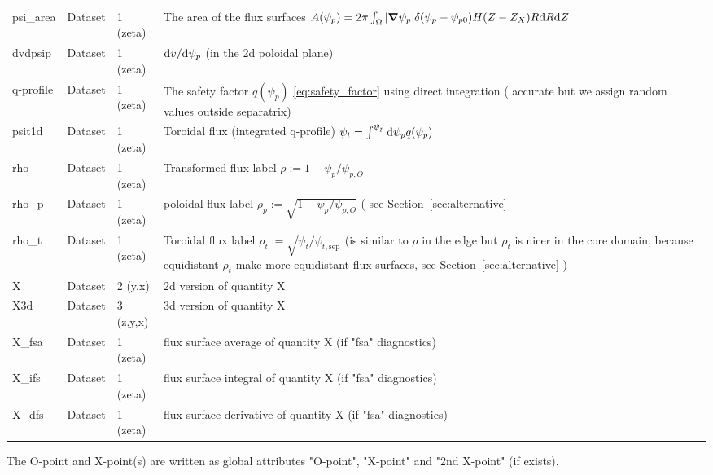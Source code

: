 \begin{longtable}{lll>{\RaggedRight}p{7cm}}
psi\_area        & Dataset & 1 (zeta) & The area of the flux surfaces $A(\psi_p) = 2\pi \int_\Omega |{\boldsymbol{\nabla}}\psi_p| \delta(\psi_p - \psi_{p0}) H(Z-Z_X) R\mathrm{d} R\mathrm{d} Z$ \\
dvdpsip          & Dataset & 1 (zeta) & $\mathrm{d} v/\mathrm{d}\psi_p$ (in the 2d poloidal plane) \\
q-profile        & Dataset & 1 (zeta) & The safety factor $q(\psi_p)$ \eqref{eq:safety_factor} using direct integration ( accurate but we assign random values outside separatrix) \\
psit1d           & Dataset & 1 (zeta) & Toroidal flux (integrated q-profile) $\psi_t = \int^{\psi_p} \mathrm{d}\psi_p q(\psi_p)$ \\
rho              & Dataset & 1 (zeta) & Transformed flux label $\rho:= 1 - \psi_p/\psi_{p,O}$ \\
rho\_p           & Dataset & 1 (zeta) & poloidal flux label $\rho_p:= \sqrt{1 - \psi_p/\psi_{p,O}}$  ( see Section~\ref{sec:alternative}\\
rho\_t           & Dataset & 1 (zeta) & Toroidal flux label $\rho_t :=
\sqrt{\psi_t/\psi_{t,\mathrm{sep}}}$ (is similar to $\rho$ in the edge but
$\rho_t$ is nicer in the core domain, because equidistant $\rho_t$ make
more equidistant flux-surfaces, see Section~\ref{sec:alternative} )\\
X      & Dataset & 2 (y,x) & 2d version of quantity X \\
X3d    & Dataset & 3 (z,y,x) & 3d version of quantity X \\
X\_fsa & Dataset & 1 (zeta) & flux surface average of quantity X (if "fsa" diagnostics)\\
X\_ifs & Dataset & 1 (zeta) & flux surface integral of quantity X (if "fsa" diagnostics)\\
X\_dfs & Dataset & 1 (zeta) & flux surface derivative of quantity X (if "fsa" diagnostics)\\
\bottomrule
\end{longtable}

The O-point and X-point(s) are written as global attributes "O-point", "X-point" and "2nd X-point" (if exists).

